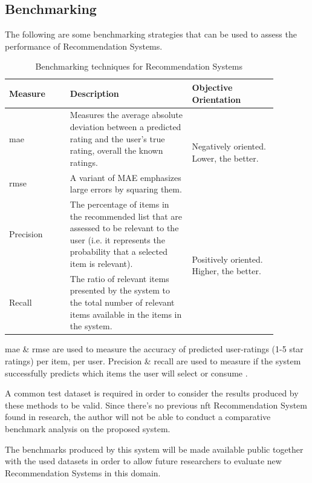 
\subsection{Benchmarking}
The following are some benchmarking strategies that can be used to assess the performance of Recommendation Systems.

\begin{longtable}{|p{0.2\linewidth}|p{0.4\linewidth}|p{0.28\linewidth}|} 
\caption{Benchmarking techniques for Recommendation Systems}
\label{tab:benchmarking-techniques-table}\\
\hline
Measure & Description & Objective Orientation \\ 
\hline
\gls{mae} & Measures the average absolute deviation between a predicted rating and the user’s true rating, overall the known ratings. & \multirow{2}{=}{Negatively oriented. Lower, the better.} \\ 
\cline{1-2}
\gls{rmse} & A variant of MAE emphasizes large errors by squaring them. &  \\ 
\hline
Precision & The percentage of items in the recommended list that are assessed to be relevant to the user (i.e. it represents the probability that a selected item is relevant). & \multirow{2}{=}{Positively oriented. Higher, the better.} \\ 
\cline{1-2}
Recall & The ratio of relevant items presented by the system to the total number of relevant items available in the items in the system. &  \\
\hline
\end{longtable}

\gls{mae} \& \gls{rmse} are used to measure the accuracy of predicted user-ratings (1-5 star ratings) per item, per user. Precision \& recall are used to measure if the system successfully predicts which items the user will select or consume \autocite{dayan_recommenders_2011}.

\bigbreak
A common test dataset is required in order to consider the results produced by these methods to be valid. Since there’s no previous \gls{nft} Recommendation System found in research, the author will not be able to conduct a comparative benchmark analysis on the proposed system.

The benchmarks produced by this system will be made available public together with the used datasets in order to allow future researchers to evaluate new Recommendation Systems in this domain.


